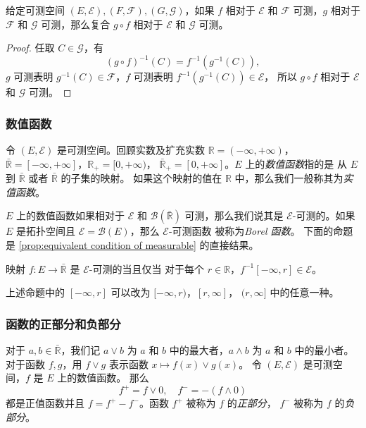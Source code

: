 \documentclass[fontset=none]{Notes}
\begin{document}
\begin{proposition}
  给定可测空间 $(E,\mathcal{E}),(F,\mathcal{F}),(G,\mathcal{G})$，如果 $f$ 相对于 $\mathcal{E}$ 和 
  $\mathcal{F}$ 可测，$g$ 相对于 $\mathcal{F}$ 和 $\mathcal{G}$ 可测，那么复合
  $g\circ f$ 相对于 $\mathcal{E}$ 和 $\mathcal{G}$ 可测。
\end{proposition}
\begin{proof}
  任取 $C\in \mathcal{G}$，有
  \[
    (g\circ f)^{-1}(C)=f^{-1}\left(g^{-1}(C)\right),  
  \]
  $g$ 可测表明 $g^{-1}(C)\in \mathcal{F}$，$f$ 可测表明 $f^{-1}\left(g^{-1}(C)\right)\in \mathcal{E}$，
  所以 $g\circ f$ 相对于 $\mathcal{E}$ 和 $\mathcal{G}$ 可测。
\end{proof}

\subsubsection{数值函数}

令 $(E,\mathcal{E})$ 是可测空间。回顾实数及扩充实数 $\mathbb{R}=(-\infty,+\infty)$，
$\bar{\mathbb{R}}=[-\infty,+\infty]$，$\mathbb{R}_+=[0,+\infty)$，
$\bar{\mathbb{R}}_+=[0,+\infty]$。$E$ 上的\emph{数值函数}指的是
从 $E$ 到 $\bar{\mathbb{R}}$ 或者 $\bar{\mathbb{R}}$ 的子集的映射。
如果这个映射的值在 $\mathbb{R}$ 中，那么我们一般称其为\emph{实值函数}。

$E$ 上的数值函数如果相对于 $\mathcal{E}$ 和 $\mathcal{B}(\bar{\mathbb{R}})$
可测，那么我们说其是 $\mathcal{E}$-可测的。如果 $E$
是拓扑空间且 $\mathcal{E}=\mathcal{B}(E)$，那么 $\mathcal{E}$-可测函数
被称为\emph{Borel 函数}。
下面的命题是 \autoref{prop:equivalent condition of measurable} 的直接结果。

\begin{proposition}
  映射 $f:E\to\bar{\mathbb{R}}$ 是 $\mathcal{E}$-可测的当且仅当
  对于每个 $r\in \mathbb{R}$，$f^{-1}[-\infty,r]\in \mathcal{E}$。
\end{proposition}

上述命题中的 $[-\infty,r]$ 可以改为 $[-\infty,r)$，$[r,\infty]$，
$(r,\infty]$ 中的任意一种。

\subsubsection{函数的正部分和负部分}

对于 $a,b\in\bar{\mathbb{R}}$，我们记 $a\vee b$ 为 $a$ 和 $b$
中的最大者，$a\wedge b$ 为 $a$ 和 $b$ 中的最小者。
对于函数 $f,g$，用 $f\vee g$ 表示函数 $x\mapsto f(x)\vee g(x)$。
令 $(E,\mathcal{E})$ 是可测空间，$f$ 是 $E$ 上的数值函数。
那么
\[
  f^+=f\vee 0,\quad f^-=-(f\wedge 0)  
\]
都是正值函数并且 $f=f^+-f^-$。函数 $f^+$ 被称为 $f$ 的\emph{正部分}，
$f^-$ 被称为 $f$ 的\emph{负部分}。
\end{document}

